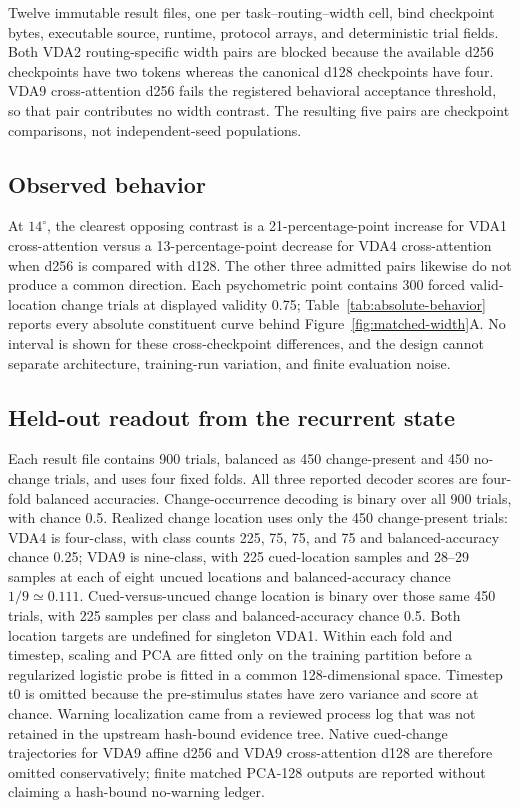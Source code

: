 \documentclass[11pt,a4paper]{article}
\begin{document}
Twelve immutable result files, one per task--routing--width cell, bind checkpoint bytes, executable source, runtime, protocol arrays, and deterministic trial fields. Both VDA2 routing-specific width pairs are blocked because the available d256 checkpoints have two tokens whereas the canonical d128 checkpoints have four. VDA9 cross-attention d256 fails the registered behavioral acceptance threshold, so that pair contributes no width contrast. The resulting five pairs are checkpoint comparisons, not independent-seed populations.

\subsection{Observed behavior}
At $14^\circ$, the clearest opposing contrast is a 21-percentage-point increase for VDA1 cross-attention versus a 13-percentage-point decrease for VDA4 cross-attention when d256 is compared with d128. The other three admitted pairs likewise do not produce a common direction. Each psychometric point contains 300 forced valid-location change trials at displayed validity 0.75; Table~\ref{tab:absolute-behavior} reports every absolute constituent curve behind Figure~\ref{fig:matched-width}A. No interval is shown for these cross-checkpoint differences, and the design cannot separate architecture, training-run variation, and finite evaluation noise.

\subsection{Held-out readout from the recurrent state}
Each result file contains 900 trials, balanced as 450 change-present and 450 no-change trials, and uses four fixed folds. All three reported decoder scores are four-fold balanced accuracies. Change-occurrence decoding is binary over all 900 trials, with chance 0.5. Realized change location uses only the 450 change-present trials: VDA4 is four-class, with class counts 225, 75, 75, and 75 and balanced-accuracy chance 0.25; VDA9 is nine-class, with 225 cued-location samples and 28--29 samples at each of eight uncued locations and balanced-accuracy chance $1/9\simeq0.111$. Cued-versus-uncued change location is binary over those same 450 trials, with 225 samples per class and balanced-accuracy chance 0.5. Both location targets are undefined for singleton VDA1. Within each fold and timestep, scaling and PCA are fitted only on the training partition before a regularized logistic probe is fitted in a common 128-dimensional space. Timestep t0 is omitted because the pre-stimulus states have zero variance and score at chance. Warning localization came from a reviewed process log that was not retained in the upstream hash-bound evidence tree. Native cued-change trajectories for VDA9 affine d256 and VDA9 cross-attention d128 are therefore omitted conservatively; finite matched PCA-128 outputs are reported without claiming a hash-bound no-warning ledger.
\end{document}
